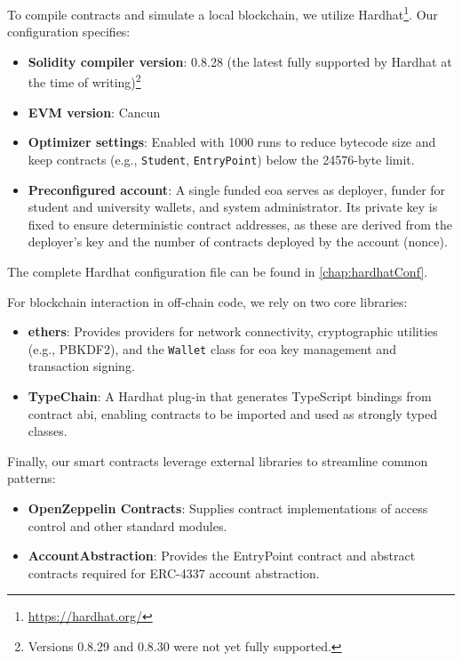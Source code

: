 To compile contracts and simulate a local blockchain, we utilize Hardhat\footnote{\url{https://hardhat.org/}}. Our configuration specifies:
\begin{itemize}
    \item \textbf{Solidity compiler version}: 0.8.28 (the latest fully supported by Hardhat at the time of writing)\footnote{Versions 0.8.29 and 0.8.30 were not yet fully supported.}
    \item \textbf{EVM version}: Cancun
    \item \textbf{Optimizer settings}: Enabled with 1000 runs to reduce bytecode size and keep contracts (e.g., \texttt{Student}, \texttt{EntryPoint}) below the 24576-byte limit.
    \item \textbf{Preconfigured account}: A single funded \acrshort{eoa} serves as deployer, funder for student and university wallets, and system administrator. Its private key is fixed to ensure deterministic contract addresses, as these are derived from the deployer’s key and the number of contracts deployed by the account (\gls{nonce}).
\end{itemize}
The complete Hardhat configuration file can be found in \cref{chap:hardhatConf}.

For blockchain interaction in off-chain code, we rely on two core libraries:
\begin{itemize}
\item \textbf{ethers}: Provides providers for network connectivity, cryptographic utilities (e.g., PBKDF2), and the \texttt{Wallet} class for \acrshort{eoa} key management and transaction signing.
\item \textbf{TypeChain}: A Hardhat plug-in that generates TypeScript bindings from contract \acrfull{abi}, enabling contracts to be imported and used as strongly typed classes.
\end{itemize}

Finally, our smart contracts leverage external libraries to streamline common patterns:
\begin{itemize}
\item \textbf{OpenZeppelin Contracts}: Supplies contract implementations of access control and other standard modules.
\item \textbf{AccountAbstraction}: Provides the EntryPoint contract and abstract contracts required for ERC-4337 account abstraction.
\end{itemize}

